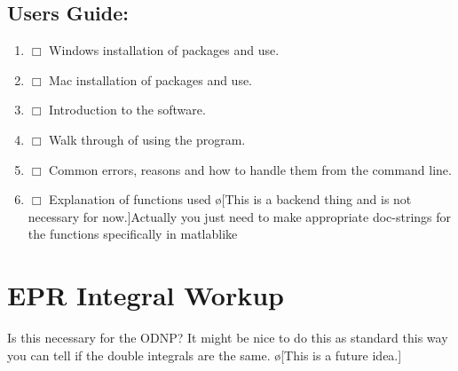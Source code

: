 \documentclass[10pt]{book}
\begin{document}
\section{Users Guide:}
\begin{enumerate}
    \item $\Box$ Windows installation of packages and use.
    \item $\Box$ Mac installation of packages and use.
    \item $\Box$ Introduction to the software.
    \item $\Box$ Walk through of using the program.
    \item $\Box$ Common errors, reasons and how to handle them from the command line.
    \item $\Box$ Explanation of functions used \o[This is a backend thing and is not necessary for now.]{Actually you just need to make appropriate doc-strings for the functions specifically in matlablike}
\end{enumerate}
\chapter{EPR Integral Workup}
Is this necessary for the ODNP? It might be nice to do this as standard this way you can tell if the double integrals are the same. \o[This is a future idea.]
\end{document}
